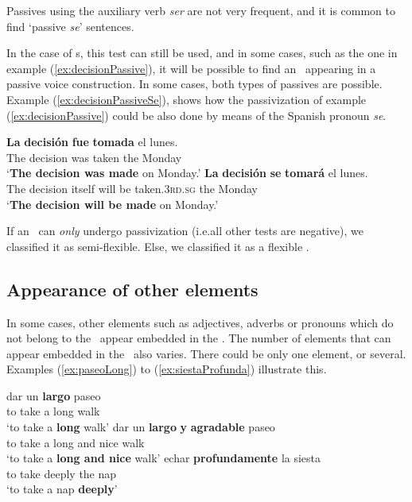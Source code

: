 \documentclass[output=paper]{langsci/langscibook}
\begin{document}
Passives using the auxiliary verb \textit{ser} are not very frequent, and it is common to find `passive \textit{se}' sentences.

In the case of \mwe s, this test can still be used, and in some cases, such as the one in example (\ref{ex:decisionPassive}), it will be possible to find an \mwe\ appearing in a passive voice construction.
In some cases, both types of passives are possible.
Example (\ref{ex:decisionPassiveSe}), shows how the passivization of example (\ref{ex:decisionPassive}) could be also done by means of the Spanish pronoun \textit{se}.

\begin{exe}
\ex \label{ex:decisionPassive}
\gll \textbf{La} \textbf{decisión} \textbf{fue} \textbf{tomada} el lunes. \\
The decision was taken the Monday\\
\glt `\textbf{The decision was made} on Monday.'
\ex \label{ex:decisionPassiveSe}
\gll \textbf{La} \textbf{decisión} \textbf{se} \textbf{tomará} el lunes. \\
The decision itself {will be taken.\textsc{3rd.sg}} the Monday\\
\glt `\textbf{The decision will be made} on Monday.'
\end{exe}

If an \mwe\ can \textit{only} undergo passivization (i.e.\@ all other tests are negative), we classified it as semi-flexible.
Else, we classified it as a flexible \mwe.

\subsection{Appearance of other elements}
\label{ssec:appearanceExtElems}
In some cases, other elements such as adjectives, adverbs or pronouns which do not belong to the \mwe\ appear embedded in the \mwe.
The number of elements that can appear embedded in the \mwe\ also varies.
There could be only one element, or several.
Examples (\ref{ex:paseoLong}) to (\ref{ex:siestaProfunda}) illustrate this.

\begin{exe}
\ex \label{ex:paseoLong}
\gll dar un \textbf{largo} paseo \\
{to take} a long walk\\
\glt `to take a \textbf{long} walk'
\ex \label{ex:paseoLongNice}
\gll dar un \textbf{largo} \textbf{y} \textbf{agradable} paseo \\
{to take} a long and nice walk \\
\glt `to take a \textbf{long and nice} walk'
\ex \label{ex:siestaProfunda}
\gll echar \textbf{profundamente} la siesta \\
{to take} deeply the nap \\
\glt `to take a nap \textbf{deeply}'
\end{exe}
\end{document}
